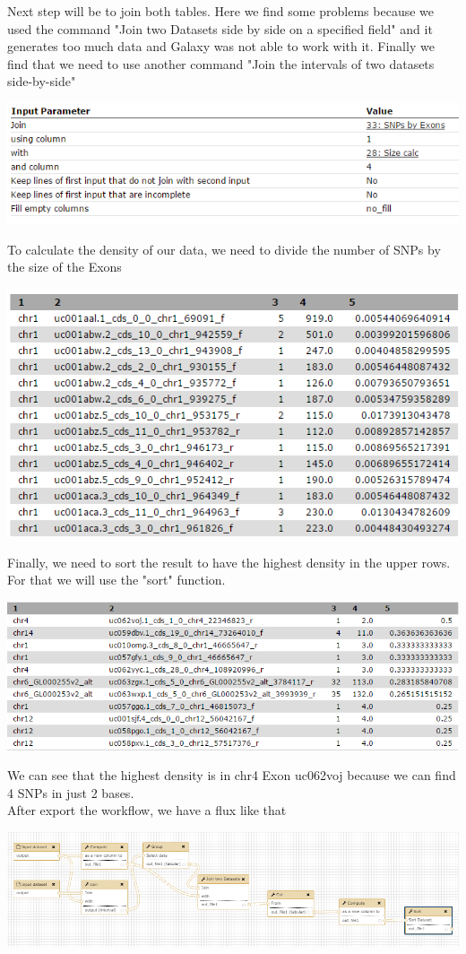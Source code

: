 \documentclass[a4paper]{article}
\begin{document}
Next step will be to join both tables. Here we find some problems because we used the command "Join two Datasets side by side on a specified field" and it generates too much data and Galaxy was not able to work with it. Finally we find that we need to use another command "Join the intervals of two datasets side-by-side"\\

\centerline{\includegraphics[scale=0.5]{34_join.PNG}}

To calculate the density of our data, we need to divide the number of SNPs by the size of the Exons\\

\centerline{\includegraphics[scale=0.5]{37_density.PNG}}

Finally, we need to sort the result to have the highest density in the upper rows. For that we will use the "sort" function.\\

\centerline{\includegraphics[scale=0.5]{result.PNG}}

We can see that the highest density is in chr4 Exon uc062voj because we can find 4 SNPs in just 2 bases.\\
After export the workflow, we have a flux like that\\

\centerline{\includegraphics[scale=0.8]{workflow.PNG}}
\end{document}
